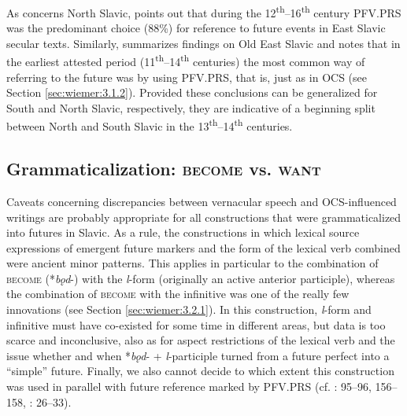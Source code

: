 \documentclass[output=paper,colorlinks,citecolor=brown]{langscibook}
\begin{document}
As concerns North Slavic, \citet[145]{Borkovskij1949} points out that during the 12\textsuperscript{th}--16\textsuperscript{th} century PFV.PRS was the predominant choice (88\%) for reference to future events in East Slavic secular texts. Similarly, \citet[124]{misina_2018} summarizes findings on Old East Slavic and notes that in the earliest attested period (11\textsuperscript{th}--14\textsuperscript{th} centuries) the most common way of referring to the future was by using PFV.PRS, that is, just as in OCS (see Section \ref{sec:wiemer:3.1.2}). Provided these conclusions can be generalized for South and North Slavic, respectively, they are indicative of a beginning split between North and South Slavic in the 13\textsuperscript{th}--14\textsuperscript{th} centuries.



\subsection{Grammaticalization: \textsc{become} vs. \textsc{want}}\label{sec:wiemer:3.2}

Caveats concerning discrepancies between vernacular speech and OCS\hyp{}influenced writings are probably appropriate for all constructions that were grammaticalized into futures in Slavic. As a rule, the constructions in which lexical source expressions of emergent future markers and the form of the lexical verb combined were ancient minor patterns. This applies in particular to the combination of \textsc{become} (*\textit{bǫd}-) with the \textit{l}-form (originally an active anterior participle), whereas the combination of \textsc{become} with the infinitive was one of the really few innovations (see Section \ref{sec:wiemer:3.2.1}). In this construction, \textit{l}-form and infinitive must have co-existed for some time in different areas, but data is too scarce and inconclusive, also as for aspect restrictions of the lexical verb and the issue whether and when *\textit{bǫd}- +\textit{ l}-participle turned from a future perfect into a “simple” future. Finally, we also cannot decide to which extent this construction was used in parallel with future reference marked by PFV.PRS (cf. \cite{Křížková1960}: 95--96, 156--158, \cite{Whaley2000}: 26--33).
\end{document}
